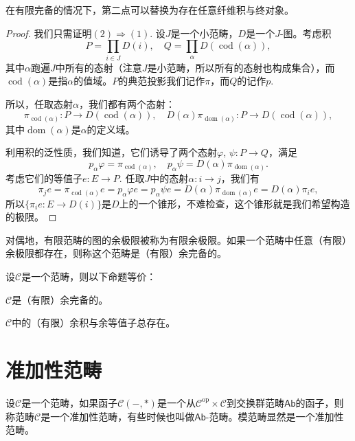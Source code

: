 在有限完备的情况下，第二点可以替换为存在任意纤维积与终对象。

\begin{proof}
我们只需证明$(2)\Rightarrow (1)$. 设$J$是一个小范畴，$D$是一个$J$-图。考虑积
\[
	P=\prod_{i\in J}D(i),\quad Q=\prod_{\alpha}D(\operatorname{cod}(\alpha)),
\]
其中$\alpha$跑遍$J$中所有的态射（注意$J$是小范畴，所以所有的态射也构成集合），而$\operatorname{cod}(\alpha)$是指$\alpha$的值域。$P$的典范投影我们记作$\pi$，而$Q$的记作$p$.

所以，任取态射$\alpha$，我们都有两个态射：
\[
	\pi_{\operatorname{cod}(\alpha)}:P\to D(\operatorname{cod}(\alpha)),\quad D(\alpha)\pi_{\operatorname{dom}(\alpha)}:P\to D(\operatorname{cod}(\alpha)),
\]
其中$\operatorname{dom}(\alpha)$是$\alpha$的定义域。

利用积的泛性质，我们知道，它们诱导了两个态射$\varphi$, $\psi:P\to Q$，满足
\[
	p_\alpha \varphi =\pi_{\operatorname{cod}(\alpha)},\quad p_\alpha\psi=D(\alpha)\pi_{\operatorname{dom}(\alpha)}.
\]
考虑它们的等值子$e:E\to P$. 任取$J$中的态射$\alpha:i\to j$，我们有
\[
	\pi_j e = \pi_{\operatorname{cod}(\alpha)}e=p_\alpha \varphi e=p_\alpha \psi e=D(\alpha)\pi_{\operatorname{dom}(\alpha)}e=D(\alpha)\pi_{i}e,
\]
所以$\{\pi_i e:E\to D(i)\}$是$D$上的一个锥形，不难检查，这个锥形就是我们希望构造的极限。
\end{proof}

\begin{para}
对偶地，有限范畴的图的余极限被称为有限余极限。如果一个范畴中任意（有限）余极限都存在，则称这个范畴是（有限）余完备的。
\end{para}

\begin{thm}\label{yuwanbei}
设$\mathcal{C}$是一个范畴，则以下命题等价：
\begin{compactenum}[~~~~(1)]
\item $\mathcal{C}$是（有限）余完备的。
\item $\mathcal{C}$中的（有限）余积与余等值子总存在。
\end{compactenum}
\end{thm}

\section{准加性范畴}

\begin{para}
设$\mathcal{C}$是一个范畴，如果函子$\mathcal{C}(-,*)$是一个从$\mathcal{C}^\text{op}\times \mathcal{C}$到交换群范畴$\mathsf{Ab}$的函子，则称范畴$\mathcal{C}$是一个准加性范畴，有些时候也叫做$\mathsf{Ab}$-范畴。模范畴显然是一个准加性范畴。
\end{para}

